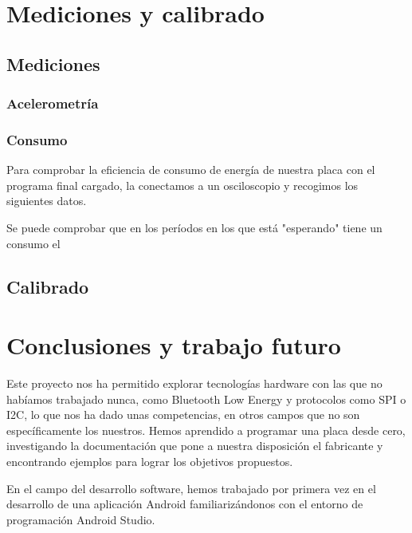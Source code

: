 \cleardoublepage

\chapter{Mediciones y calibrado}
\label{makereference7}

\section{Mediciones}

\subsection{Acelerometría}

\subsection{Consumo}

Para comprobar la eficiencia de consumo de energía de nuestra placa con el programa final cargado, la conectamos a un osciloscopio y recogimos los siguientes datos.


Se puede comprobar que  en los períodos en los que está "esperando" tiene un consumo el

\section{Calibrado}



\cleardoublepage

\chapter{Conclusiones y trabajo futuro}
\label{makereference8}

Este proyecto nos ha permitido explorar tecnologías hardware con las que no habíamos trabajado nunca, como Bluetooth Low Energy y protocolos como SPI o I2C, lo que nos ha dado unas competencias, en otros campos que no son específicamente los nuestros. Hemos aprendido a programar una placa desde cero, investigando la documentación que pone a nuestra disposición el fabricante y encontrando ejemplos para lograr los objetivos propuestos.

En el campo del desarrollo software, hemos trabajado por primera vez en el desarrollo de una aplicación Android familiarizándonos con el entorno de programación Android Studio.

